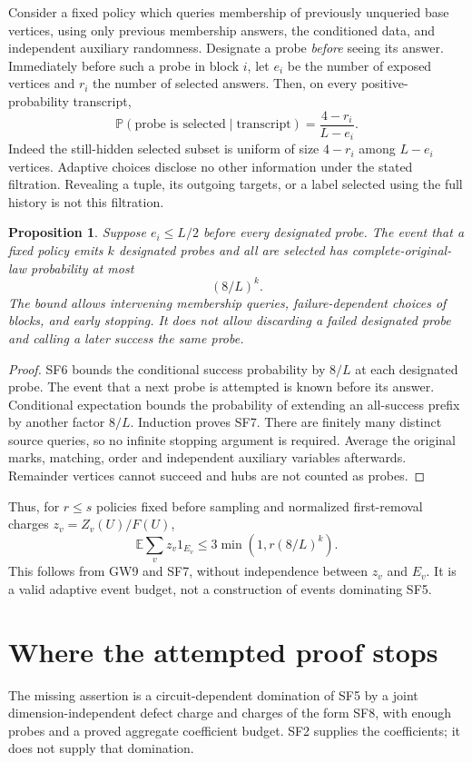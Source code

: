 \documentclass[11pt]{article}
\newtheorem{proposition}{Proposition}
\newcommand{\E}{\mathbb E}
\newcommand{\Prb}{\mathbb P}
\begin{document}
Consider a fixed policy which queries membership of previously
unqueried base vertices, using only previous membership answers,
the conditioned data, and independent auxiliary randomness.
Designate a probe \emph{before} seeing its answer.
Immediately before such a probe in block $i$, let $e_i$ be the
number of exposed vertices and $r_i$ the number of selected answers.
Then, on every positive-probability transcript,
\[
 \Prb(\text{probe is selected}\mid\text{transcript})
                        =\frac{4-r_i}{L-e_i}.                    \tag{SF6}
\]
Indeed the still-hidden selected subset is uniform of size $4-r_i$
among $L-e_i$ vertices. Adaptive choices disclose no other information
under the stated filtration. Revealing a tuple, its outgoing targets,
or a label selected using the full history is not this filtration.

\begin{proposition}
Suppose $e_i\le L/2$ before every designated probe. The event that
a fixed policy emits $k$ designated probes and all are selected has
complete-original-law probability at most
\[
                         (8/L)^k.                              \tag{SF7}
\]
The bound allows intervening membership queries, failure-dependent
choices of blocks, and early stopping. It does not allow discarding
a failed designated probe and calling a later success the same probe.
\end{proposition}
\begin{proof}
SF6 bounds the conditional success probability by $8/L$ at each
designated probe. The event that a next probe is attempted is known
before its answer. Conditional expectation bounds the probability
of extending an all-success prefix by another factor $8/L$.
Induction proves SF7. There are finitely many distinct source queries,
so no infinite stopping argument is required. Average the original
marks, matching, order and independent auxiliary variables afterwards.
Remainder vertices cannot succeed and hubs are not counted as probes.
\end{proof}

Thus, for $r\le s$ policies fixed before sampling and normalized
first-removal charges $z_v=Z_v(U)/F(U)$,
\[
 \E\sum_v z_v1_{E_v}\le3\min(1,r(8/L)^k).                       \tag{SF8}
\]
This follows from GW9 and SF7, without independence between $z_v$
and $E_v$. It is a valid adaptive event budget, not a construction
of events dominating SF5.

\section{Where the attempted proof stops}
The missing assertion is a circuit-dependent domination of SF5 by
a joint dimension-independent defect charge and charges of the form
SF8, with enough probes and a proved aggregate coefficient budget.
SF2 supplies the coefficients; it does not supply that domination.
\end{document}
